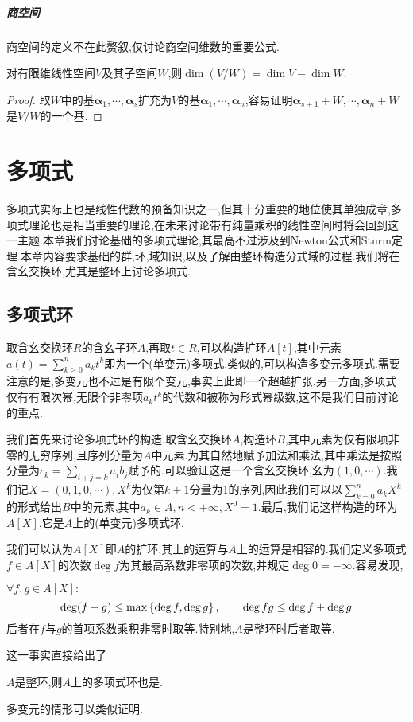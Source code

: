 \documentclass[openany]{book}
\begin{document}
\paragraph{商空间}商空间的定义不在此赘叙,仅讨论商空间维数的重要公式.
\begin{theorem}
    对有限维线性空间$V$及其子空间$W$,则$\dim(V/W)=\dim V-\dim W$.
\end{theorem}
\begin{proof}
    取$W$中的基$\bm{\alpha}_1,\cdots,\bm{\alpha}_s$扩充为$V$的基$\bm{\alpha}_1,\cdots,\bm{\alpha}_n$,容易证明$\bm{\alpha}_{s+1}+W,\cdots,\bm{\alpha}_{n}+W$是$V/W$的一个基.
\end{proof}

\chapter{多项式}
多项式实际上也是线性代数的预备知识之一,但其十分重要的地位使其单独成章,多项式理论也是相当重要的理论,在未来讨论带有纯量乘积的线性空间时将会回到这一主题.本章我们讨论基础的多项式理论,其最高不过涉及到Newton公式和Sturm定理.本章内容要求基础的群,环,域知识,以及了解由整环构造分式域的过程.我们将在含幺交换环,尤其是整环上讨论多项式.

\section{多项式环}
取含幺交换环$R$的含幺子环$A$,再取$t\in R$,可以构造扩环$A[t]$,其中元素$a(t)=\sum_{k\geq 0}^n a_kt^k$即为一个(单变元)多项式.类似的,可以构造多变元多项式.需要注意的是,多变元也不过是有限个变元,事实上此即一个超越扩张.另一方面,多项式仅有有限次幂,无限个非零项$a_kt^k$的代数和被称为形式幂级数,这不是我们目前讨论的重点.

我们首先来讨论多项式环的构造.取含幺交换环$A$,构造环$B$,其中元素为仅有限项非零的无穷序列,且序列分量为$A$中元素.为其自然地赋予加法和乘法,其中乘法是按照分量为$c_k=\sum_{i+j=k}a_ib_j$赋予的.可以验证这是一个含幺交换环,幺为$(1,0,\cdots)$.我们记$X=(0,1,0,\cdots),X^k$为仅第$k+1$分量为1的序列,因此我们可以以$\sum_{k=0}^n a_kX^k$的形式给出$B$中的元素,其中$a_k\in A,n<+\infty, X^0=1$.最后,我们记这样构造的环为$A[X]$,它是$A$上的(单变元)多项式环.

我们可以认为$A[X]$即$A$的扩环,其上的运算与$A$上的运算是相容的.我们定义多项式$f\in A[X]$的次数$\deg f$为其最高系数非零项的次数,并规定$\deg 0=-\infty$.容易发现,
\begin{proposition}
    $\forall f,g\in A[X]:$
    $$\deg (f+g)\leq \max\left\{\deg f,\deg g\right\},\qquad \deg fg\leq \deg f+\deg g$$
    后者在$f$与$g$的首项系数乘积非零时取等.特别地,$A$是整环时后者取等.
\end{proposition}
这一事实直接给出了
\begin{theorem}
    $A$是整环,则$A$上的多项式环也是.
\end{theorem}
多变元的情形可以类似证明.
\end{document}
